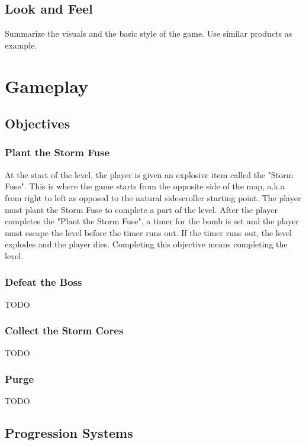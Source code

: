\documentclass[12pt]{article}
\begin{document}
\subsection{Look and Feel}

Summarize the visuals and the basic style of the game. Use similar products as example. 

\section{Gameplay}

\subsection{Objectives}

\subsubsection{Plant the Storm Fuse}

At the start of the level, the player is given an explosive item called the "Storm Fuse". This is where the game starts from the  opposite side of the map, a.k.a from right to left as opposed to the natural sidescroller starting point. The player must plant the Storm Fuse to complete a part of the level. After the player completes the "Plant the Storm Fuse", a timer for the bomb is set and the player must escape the level before the timer runs out. If the timer runs out, the level explodes and the player dies. Completing this objective means completing the level. 

\subsubsection{Defeat the Boss}

TODO

\subsubsection{Collect the Storm Cores}

TODO

\subsubsection{Purge}

TODO

\subsection{Progression Systems}
\end{document}
